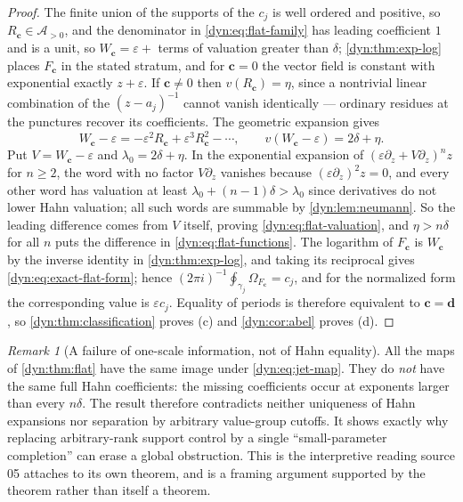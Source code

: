 \documentclass[11pt,letterpaper]{article}
\theoremstyle{definition}
\theoremstyle{remark}
\newtheorem{remark}[remark]{Remark}
\newcommand{\AAA}{\mathscr A}
\newcommand{\eps}{\varepsilon}
\numberwithin{equation}{section}
\begin{document}
\begin{proof}
The finite union of the supports of the $c_j$ is well ordered and positive,
so $R_{\mathbf c}\in\AAA_{>0}$, and the denominator in
\eqref{dyn:eq:flat-family} has leading coefficient $1$ and is a unit, so
$W_{\mathbf c}=\eps+$ terms of valuation greater than $\delta$;
\cref{dyn:thm:exp-log} places $F_{\mathbf c}$ in the stated stratum, and
for $\mathbf c=0$ the vector field is constant with exponential exactly
$z+\eps$. If $\mathbf c\ne0$ then $v(R_{\mathbf c})=\eta$, since a
nontrivial linear combination of the $(z-a_j)^{-1}$ cannot vanish
identically --- ordinary residues at the punctures recover its
coefficients. The geometric expansion gives
\begin{equation}\label{dyn:eq:Wflat-difference}
 W_{\mathbf c}-\eps=-\eps^{2}R_{\mathbf c}+\eps^{3}R_{\mathbf c}^{2}-\cdots,
 \qquad v(W_{\mathbf c}-\eps)=2\delta+\eta .
\end{equation}
Put $V=W_{\mathbf c}-\eps$ and $\lambda_0=2\delta+\eta$. In the exponential
expansion of $(\eps\partial_z+V\partial_z)^{n}z$ for $n\ge2$, the word with
no factor $V\partial_z$ vanishes because $(\eps\partial_z)^{2}z=0$, and
every other word has valuation at least $\lambda_0+(n-1)\delta>\lambda_0$
since derivatives do not lower Hahn valuation; all such words are summable
by \cref{dyn:lem:neumann}. So the leading difference comes from $V$ itself,
proving \eqref{dyn:eq:flat-valuation}, and $\eta>n\delta$ for all $n$ puts
the difference in \eqref{dyn:eq:flat-functions}. The logarithm of
$F_{\mathbf c}$ is $W_{\mathbf c}$ by the inverse identity in
\cref{dyn:thm:exp-log}, and taking its reciprocal gives
\eqref{dyn:eq:exact-flat-form}; hence
$(2\pi i)^{-1}\oint_{\gamma_j}\Omega_{F_{\mathbf c}}=c_j$, and for the
normalized form the corresponding value is $\eps c_j$. Equality of periods
is therefore equivalent to $\mathbf c=\mathbf d$, so
\cref{dyn:thm:classification} proves (c) and \cref{dyn:cor:abel} proves
(d).
\end{proof}

\begin{remark}[A failure of one-scale information, not of Hahn equality]
\label{dyn:rem:flat}
All the maps of \cref{dyn:thm:flat} have the same image under
\eqref{dyn:eq:jet-map}. They do \emph{not} have the same full Hahn
coefficients: the missing coefficients occur at exponents larger than every
$n\delta$. The result therefore contradicts neither uniqueness of Hahn
expansions nor separation by arbitrary value-group cutoffs. It shows
exactly why replacing arbitrary-rank support control by a single
``small-parameter completion'' can erase a global obstruction. This is the
interpretive reading source 05 attaches to its own theorem, and is a
framing argument supported by the theorem rather than itself a theorem.
\end{remark}
\end{document}
